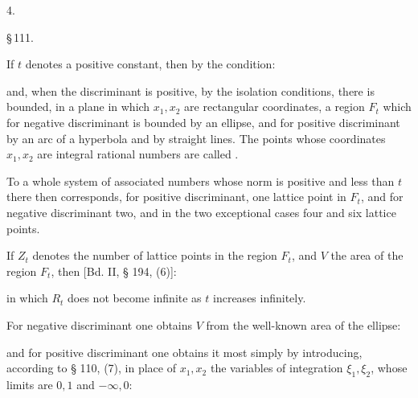 
4. 



\begin{center}
\S\,111. 
\end{center}

If $t$ denotes a positive constant, then by the condition:

and, when the discriminant is positive, by the isolation conditions, there is
bounded, in a plane in which $x_1, x_2$ are rectangular coordinates, a region
$F_t$ which for negative discriminant is bounded by an ellipse, and for
positive discriminant by an arc of a hyperbola and by straight lines. The
points whose coordinates $x_1, x_2$ are integral rational numbers are called .

To a whole system of associated numbers whose norm is positive and less than
$t$ there then corresponds, for positive discriminant, one lattice point in
$F_t$, and for negative discriminant two, and in the two exceptional cases
four and six lattice points.

If $Z_t$ denotes the number of lattice points in the region $F_t$, and $V$ the
area of the region $F_t$, then [Bd. II, § 194, (6)]:

in which $R_t$ does not become infinite as $t$ increases infinitely.

For negative discriminant one obtains $V$ from the well-known area of the
ellipse:

and for positive discriminant one obtains it most simply by introducing,
according to § 110, (7), in place of $x_1, x_2$ the variables of integration
$\xi_1, \xi_2$, whose limits are $0, 1$ and $-\infty, 0$:

